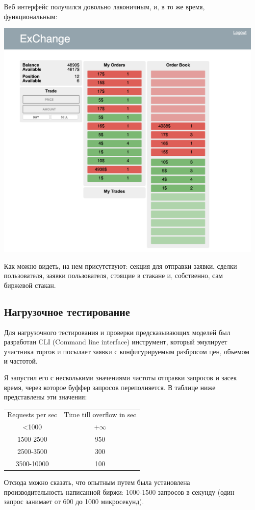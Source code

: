 \newpage
Веб интерфейс получился довольно лаконичным, и, в то же время, функциональным:

\begin{center}
    \includegraphics[width=450pt]{images/interface_screenshot.png}
\end{center}

Как можно видеть, на нем присутствуют: секция для отправки заявки, сделки пользователя, заявки пользователя, стоящие в стакане и, собственно, сам биржевой стакан.

\newpage
\subsection{Нагрузочное тестирование }

Для нагрузочного тестирования и проверки предсказывающих моделей был разработан CLI (Command line interface) инструмент, который эмулирует участника торгов и посылает заявки с конфигурируемым разбросом цен, объемом и частотой.

Я запустил его с несколькими значениями частоты отправки запросов и засек время, через которое буффер запросов переполняется. В таблице ниже представлены эти значения:


\begin{center}
\begin{tabular}{ c c }
 Requests per sec & Time till overflow in sec \\ 
 <1000 & $+\infty$\\
 1500-2500 & 950 \\
 2500-3500 & 300 \\
 3500-10000 & 100 \\
\end{tabular}
\end{center}

Отсюда можно сказать, что опытным путем была установлена производительность написанной биржи: 1000-1500 запросов в секунду (один запрос занимает от 600 до 1000 микросекунд).


\newpage
